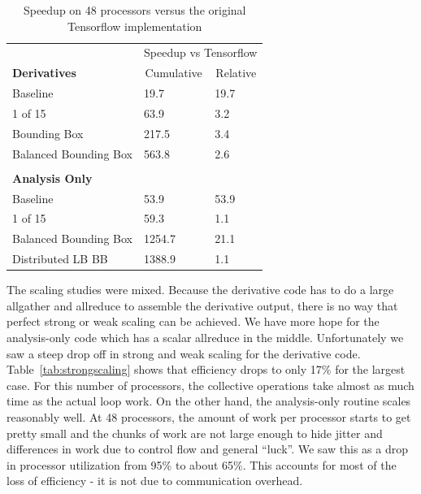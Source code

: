 \documentclass[11pt,letterpaper]{article}
\begin{document}
\begin{table}[]
  \centering
  \begin{tabular}{lll}
                                              & \multicolumn{2}{c}{Speedup vs Tensorflow}                     \\
  \textbf{Derivatives}                        & \multicolumn{1}{c}{Cumulative} & \multicolumn{1}{c}{Relative} \\ \cline{2-3}
  \multicolumn{1}{l|}{Baseline}               & 19.7                           & 19.7                         \\
  \multicolumn{1}{l|}{1 of 15}                & 63.9                           & 3.2                          \\
  \multicolumn{1}{l|}{Bounding Box}           & 217.5                          & 3.4                          \\
  \multicolumn{1}{l|}{Balanced Bounding Box}            & 563.8                          & 2.6                          \\
  \multicolumn{1}{l|}{}                       &                                &                              \\
  \multicolumn{1}{l|}{\textbf{Analysis Only}} &                                &                              \\
  \multicolumn{1}{l|}{Baseline}               & 53.9                           & 53.9                         \\
  \multicolumn{1}{l|}{1 of 15}                & 59.3                           & 1.1                          \\
  \multicolumn{1}{l|}{Balanced Bounding Box}  & 1254.7                         & 21.1                         \\
  \multicolumn{1}{l|}{Distributed LB BB}                & 1388.9                         & 1.1
  \end{tabular}
\caption{Speedup on 48 processors versus the original Tensorflow implementation}
\label{tab:speedup}

    \end{table}

\qquad The scaling studies were mixed.
Because the derivative code has to do a large allgather and allreduce to assemble the derivative output, there is no way that perfect strong or weak scaling can be achieved.
We have more hope for the analysis-only code which has a scalar allreduce in the middle.
Unfortunately we saw a steep drop off in strong and weak scaling for the derivative code.
Table~\ref{tab:strongscaling} shows that efficiency drops to only 17\% for the largest case.
For this number of processors, the collective operations take almost as much time as the actual loop work.
On the other hand, the analysis-only routine scales reasonably well.
At 48 processors, the amount of work per processor starts to get pretty small and the chunks of work are not large enough to hide jitter and differences in work due to control flow and general ``luck''.
We saw this as a drop in processor utilization from 95\% to about 65\%.
This accounts for most of the loss of efficiency - it is not due to communication overhead.
\end{document}
